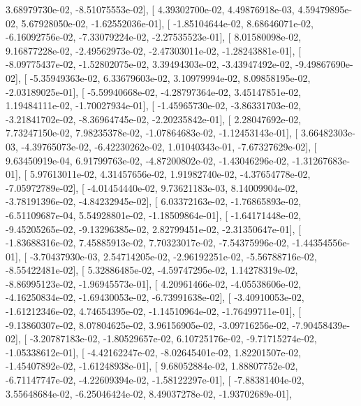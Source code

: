\documentclass{article}
\begin{document}
          3.68979730e-02,  -8.51075553e-02],
       [  4.39302700e-02,   4.49876918e-03,   4.59479895e-02,
          5.67928050e-02,  -1.62552036e-01],
       [ -1.85104644e-02,   8.68646071e-02,  -6.16092756e-02,
         -7.33079224e-02,  -2.27535523e-01],
       [  8.01580098e-02,   9.16877228e-02,  -2.49562973e-02,
         -2.47303011e-02,  -1.28243881e-01],
       [ -8.09775437e-02,  -1.52802075e-02,   3.39494303e-02,
         -3.43947492e-02,  -9.49867690e-02],
       [ -5.35949363e-02,   6.33679603e-02,   3.10979994e-02,
          8.09858195e-02,  -2.03189025e-01],
       [ -5.59940668e-02,  -4.28797364e-02,   3.45147851e-02,
          1.19484111e-02,  -1.70027934e-01],
       [ -1.45965730e-02,  -3.86331703e-02,  -3.21841702e-02,
         -8.36964745e-02,  -2.20235842e-01],
       [  2.28047692e-02,   7.73247150e-02,   7.98235378e-02,
         -1.07864683e-02,  -1.12453143e-01],
       [  3.66482303e-03,  -4.39765073e-02,  -6.42230262e-02,
          1.01040343e-01,  -7.67327629e-02],
       [  9.63450919e-04,   6.91799763e-02,  -4.87200802e-02,
         -1.43046296e-02,  -1.31267683e-01],
       [  5.97613011e-02,   4.31457656e-02,   1.91982740e-02,
         -4.37654778e-02,  -7.05972789e-02],
       [ -4.01454440e-02,   9.73621183e-03,   8.14009904e-02,
         -3.78191396e-02,  -4.84232945e-02],
       [  6.03372163e-02,  -1.76865893e-02,  -6.51109687e-04,
          5.54928801e-02,  -1.18509864e-01],
       [ -1.64171448e-02,  -9.45205265e-02,  -9.13296385e-02,
          2.82799451e-02,  -2.31350647e-01],
       [ -1.83688316e-02,   7.45885913e-02,   7.70323017e-02,
         -7.54375996e-02,  -1.44354556e-01],
       [ -3.70437930e-03,   2.54714205e-02,  -2.96192251e-02,
         -5.56788716e-02,  -8.55422481e-02],
       [  5.32886485e-02,  -4.59747295e-02,   1.14278319e-02,
         -8.86995123e-02,  -1.96945573e-01],
       [  4.20961466e-02,  -4.05538606e-02,  -4.16250834e-02,
         -1.69430053e-02,  -6.73991638e-02],
       [ -3.40910053e-02,  -1.61212346e-02,   4.74654395e-02,
         -1.14510964e-02,  -1.76499711e-01],
       [ -9.13860307e-02,   8.07804625e-02,   3.96156905e-02,
         -3.09716256e-02,  -7.90458439e-02],
       [ -3.20787183e-02,  -1.80529657e-02,   6.10725176e-02,
         -9.71715274e-02,  -1.05338612e-01],
       [ -4.42162247e-02,  -8.02645401e-02,   1.82201507e-02,
         -1.45407892e-02,  -1.61248938e-01],
       [  9.68052884e-02,   1.88807752e-02,  -6.71147747e-02,
         -4.22609394e-02,  -1.58122297e-01],
       [ -7.88381404e-02,   3.55648684e-02,  -6.25046424e-02,
          8.49037278e-02,  -1.93702689e-01],
\end{document}
